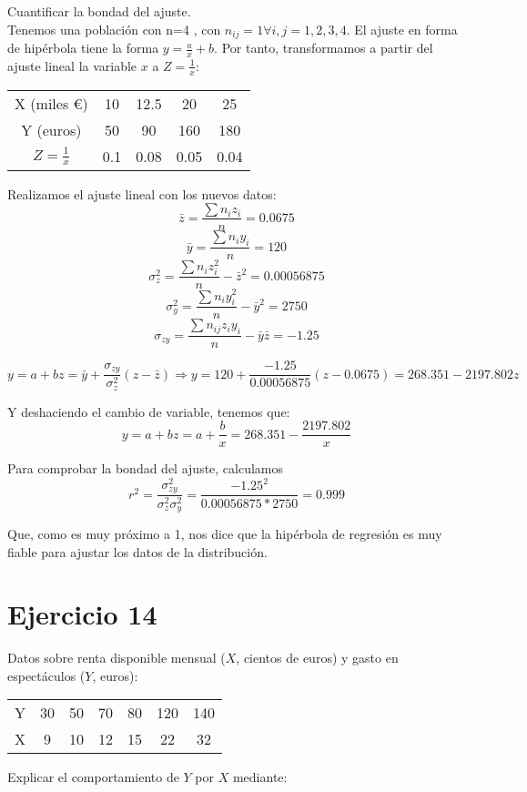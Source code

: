 \documentclass[a4paper,12pt]{article}
\begin{document}
Cuantificar la bondad del ajuste.\\

Tenemos una población con n=4 , con $n_{ij}=1 \forall i,j =1,2,3,4$. El ajuste en forma de hipérbola tiene la forma $y=\frac{a}{x} + b$. Por tanto, transformamos a partir del ajuste lineal la variable $x$ a $Z=\frac{1}{x}$:
\begin{center}
\begin{tabular}{c|cccc}
X (miles €) & 10 & 12.5 & 20 & 25 \\
Y (euros) & 50 & 90 & 160 & 180 \\
\hline
$Z=\frac{1}{x}$ & 0.1 & 0.08 & 0.05 & 0.04\\
\end{tabular}
\end{center}

Realizamos el ajuste lineal con los nuevos datos:
$$\bar z= \frac {\sum n_iz_i}{n}=0.0675$$
$$\bar y=\frac {\sum n_iy_i}{n}= 120$$
$$\sigma_z^2=\frac {\sum n_iz_i^2}{n}-\bar z^2 = 0.00056875$$
$$\sigma_y^2=\frac {\sum n_iy_i^2}{n}-\bar y^2 = 2750$$
$$\sigma_{zy}=\frac {\sum n_{ij}z_iy_i}{n}-\bar y \bar z = -1.25$$

$$y= a+bz = \bar y + \frac {\sigma_{zy}}{\sigma_z^2}(z-\bar z) \Rightarrow y=120 + \frac {-1.25}{0.00056875}(z-0.0675) = 268.351 -2197.802z$$

Y deshaciendo el cambio de variable, tenemos que:
$$y= a+bz = a +\frac{b}{x} = 268.351 -\frac{2197.802}{x}$$

Para comprobar la bondad del ajuste, calculamos 
$$r^2 = \frac{\sigma_{zy}^2}{\sigma_z^2\sigma_y^2}=\frac{-1.25^2}{0.00056875*2750}=0.999$$

Que, como es muy próximo a 1, nos dice que la hipérbola de regresión es muy fiable para ajustar los datos de la distribución.

\section*{Ejercicio 14}
Datos sobre renta disponible mensual ($X$, cientos de euros) y gasto en espectáculos ($Y$, euros):
\begin{center}
\begin{tabular}{c|cccccc}
Y & 30 & 50 & 70 & 80 & 120 & 140 \\
X & 9 & 10 & 12 & 15 & 22 & 32 \\
\end{tabular}
\end{center}

Explicar el comportamiento de $Y$ por $X$ mediante:
\end{document}
